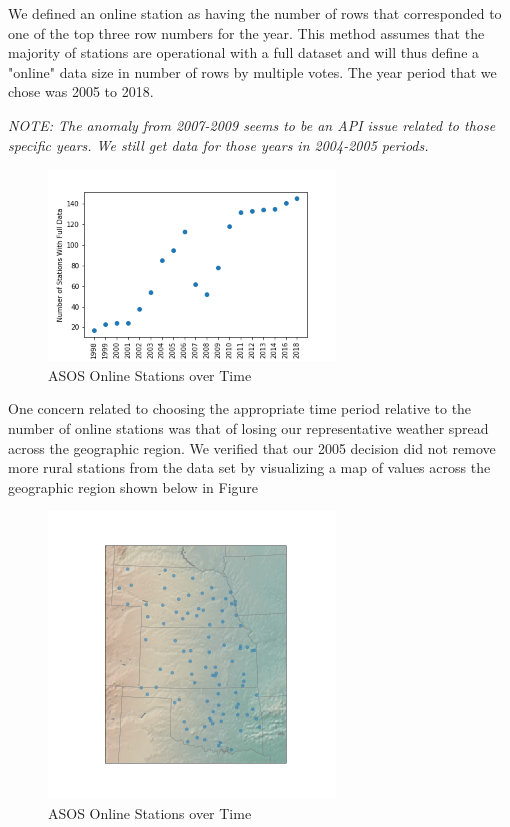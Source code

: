 \documentclass[twoside,11pt]{article}
\begin{document}
	We defined an online station as having the number of rows that corresponded to one of the top three row numbers for the year. This method assumes that the majority of stations are operational with a full dataset and will thus define a "online" data size in number of rows by multiple votes. The year period that we chose was 2005 to 2018.
	
	\textit{NOTE: The anomaly from 2007-2009 seems to be an API issue related to those specific years. We still get data for those years in 2004-2005 periods.}
	
	\begin{figure}[htbp]
		\centering
		\includegraphics[width=3in]{ASOSstations.png}
		\caption{ASOS Online Stations over Time}
		\label{fig:asosstations}
	\end{figure}

	One concern related to choosing the appropriate time period relative to the number of online stations was that of losing our representative weather spread across the geographic region. We verified that our 2005 decision did not remove more rural stations from the data set by visualizing a map of values across the geographic region shown below in Figure 
	
	\begin{figure}[htbp]
		\centering
		\includegraphics[width=3in]{ASOSspread.png}
		\caption{ASOS Online Stations over Time}\label{fig:asosspread}
	\end{figure}
	
\end{document}
